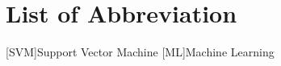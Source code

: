 \section*{List of Abbreviation} %


\begin{acronym}[HBCI]
    [SVM]{Support Vector Machine}
    [ML]{Machine Learning}
\end{acronym}